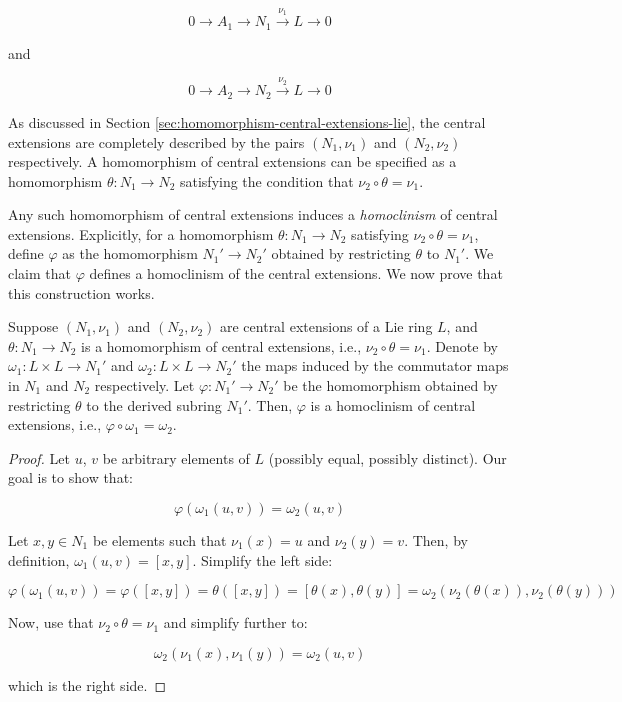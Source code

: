 \documentclass{ucetd}
\begin{document}
$$0 \to A_1 \to N_1 \stackrel{\nu_1}{\to} L \to 0$$

and

$$0 \to A_2 \to N_2 \stackrel{\nu_2}{\to} L \to 0$$

As discussed in Section \ref{sec:homomorphism-central-extensions-lie}, the
central extensions are completely described by the pairs $(N_1,\nu_1)$
and $(N_2,\nu_2)$ respectively. A homomorphism of central extensions
can be specified as a homomorphism $\theta:N_1 \to N_2$ satisfying the
condition that $\nu_2 \circ \theta = \nu_1$.

Any such homomorphism of central extensions induces a {\em
  homoclinism} of central extensions. Explicitly, for a homomorphism
$\theta: N_1 \to N_2$ satisfying $\nu_2 \circ \theta = \nu_1$, define
$\varphi$ as the homomorphism $N_1' \to N_2'$ obtained by restricting
$\theta$ to $N_1'$. We claim that $\varphi$ defines a homoclinism of
the central extensions. We now prove that this construction works.

\begin{lemma}\label{lemma:homomorphism-restriction-homoclinism-lie}
  Suppose $(N_1,\nu_1)$ and $(N_2,\nu_2)$ are central extensions of a
  Lie ring $L$, and $\theta:N_1 \to N_2$ is a homomorphism of central
  extensions, i.e., $\nu_2 \circ \theta = \nu_1$. Denote by $\omega_1:
  L \times L \to N_1'$ and $\omega_2: L \times L \to N_2'$ the maps
  induced by the commutator maps in $N_1$ and $N_2$ respectively. Let
  $\varphi:N_1' \to N_2'$ be the homomorphism obtained by restricting
  $\theta$ to the derived subring $N_1'$. Then, $\varphi$ is a
  homoclinism of central extensions, i.e., $\varphi \circ \omega_1 =
  \omega_2$.
\end{lemma}

\begin{proof}
  Let $u$, $v$ be arbitrary elements of $L$ (possibly equal, possibly
  distinct). Our goal is to show that:

  $$\varphi(\omega_1(u,v)) = \omega_2(u,v)$$

  Let $x, y \in N_1$ be elements such that $\nu_1(x) = u$ and
  $\nu_2(y) = v$. Then, by definition, $\omega_1(u,v) =
  [x,y]$. Simplify the left side:

  $$\varphi(\omega_1(u,v)) = \varphi([x,y]) = \theta([x,y]) = [\theta(x),\theta(y)] = \omega_2(\nu_2(\theta(x)),\nu_2(\theta(y)))$$

  Now, use that $\nu_2 \circ \theta = \nu_1$ and simplify further to:

  $$\omega_2(\nu_1(x),\nu_1(y)) = \omega_2(u,v)$$

  which is the right side.
\end{proof}
\end{document}
